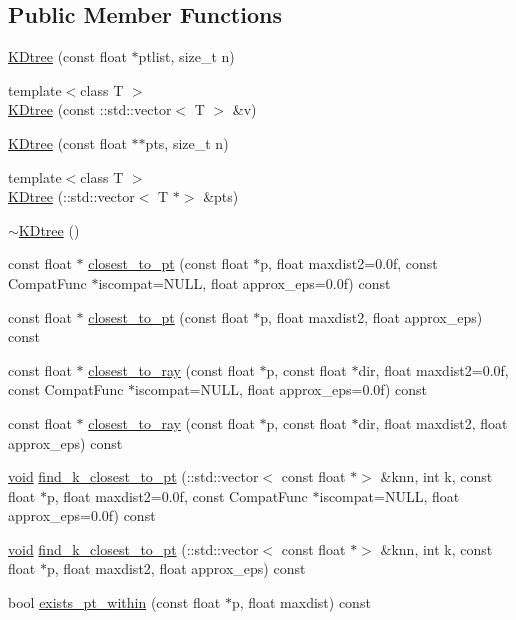 \subsection*{Public Member Functions}
\begin{DoxyCompactItemize}
\item 
\hyperlink{classtrimesh_1_1KDtree_a7981d4d8eabd12d52c2887cfa94f4c33}{K\+Dtree} (const float $\ast$ptlist, size\+\_\+t n)
\item 
{\footnotesize template$<$class T $>$ }\\\hyperlink{classtrimesh_1_1KDtree_ab766871a5877b9488e90b9651a0c2b2c}{K\+Dtree} (const \+::std\+::vector$<$ T $>$ \&v)
\item 
\hyperlink{classtrimesh_1_1KDtree_acd7beb7544e1de886ffab14750075aab}{K\+Dtree} (const float $\ast$$\ast$pts, size\+\_\+t n)
\item 
{\footnotesize template$<$class T $>$ }\\\hyperlink{classtrimesh_1_1KDtree_a36b9522141b8c5f2c6bb17d58a469b10}{K\+Dtree} (\+::std\+::vector$<$ T $\ast$$>$ \&pts)
\item 
\hyperlink{classtrimesh_1_1KDtree_acf920211054016e32477fdbd19c5b22c}{$\sim$\+K\+Dtree} ()
\item 
const float $\ast$ \hyperlink{classtrimesh_1_1KDtree_a9428ce5432d045f9e3e33c381de413b2}{closest\+\_\+to\+\_\+pt} (const float $\ast$p, float maxdist2=0.\+0f, const Compat\+Func $\ast$iscompat=\+N\+U\+L\+L, float approx\+\_\+eps=0.\+0f) const
\item 
const float $\ast$ \hyperlink{classtrimesh_1_1KDtree_a90066965f638191f3bb2edab8d70ab3a}{closest\+\_\+to\+\_\+pt} (const float $\ast$p, float maxdist2, float approx\+\_\+eps) const
\item 
const float $\ast$ \hyperlink{classtrimesh_1_1KDtree_a3e3cc3eff36b04c01c065fcee1364922}{closest\+\_\+to\+\_\+ray} (const float $\ast$p, const float $\ast$dir, float maxdist2=0.\+0f, const Compat\+Func $\ast$iscompat=\+N\+U\+L\+L, float approx\+\_\+eps=0.\+0f) const
\item 
const float $\ast$ \hyperlink{classtrimesh_1_1KDtree_a686507f137048b734f4cc35700461701}{closest\+\_\+to\+\_\+ray} (const float $\ast$p, const float $\ast$dir, float maxdist2, float approx\+\_\+eps) const
\item 
\hyperlink{namespacetrimesh_a784ddfd979e1c579bda795a8edfc3f43}{void} \hyperlink{classtrimesh_1_1KDtree_a2b509a64df2781b18abac13a8683241d}{find\+\_\+k\+\_\+closest\+\_\+to\+\_\+pt} (\+::std\+::vector$<$ const float $\ast$$>$ \&knn, int k, const float $\ast$p, float maxdist2=0.\+0f, const Compat\+Func $\ast$iscompat=\+N\+U\+L\+L, float approx\+\_\+eps=0.\+0f) const
\item 
\hyperlink{namespacetrimesh_a784ddfd979e1c579bda795a8edfc3f43}{void} \hyperlink{classtrimesh_1_1KDtree_a1466c3d0b144459fb4472ea05f6d70bc}{find\+\_\+k\+\_\+closest\+\_\+to\+\_\+pt} (\+::std\+::vector$<$ const float $\ast$$>$ \&knn, int k, const float $\ast$p, float maxdist2, float approx\+\_\+eps) const
\item 
bool \hyperlink{classtrimesh_1_1KDtree_ad8e2126c11fce117f6fa699301348173}{exists\+\_\+pt\+\_\+within} (const float $\ast$p, float maxdist) const
\end{DoxyCompactItemize}



